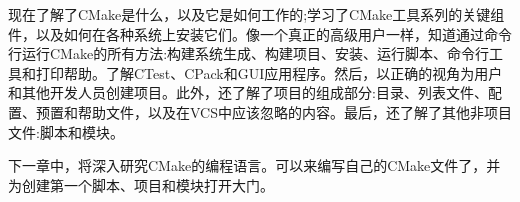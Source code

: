 现在了解了CMake是什么，以及它是如何工作的;学习了CMake工具系列的关键组件，以及如何在各种系统上安装它们。像一个真正的高级用户一样，知道通过命令行运行CMake的所有方法:构建系统生成、构建项目、安装、运行脚本、命令行工具和打印帮助。了解CTest、CPack和GUI应用程序。然后，以正确的视角为用户和其他开发人员创建项目。此外，还了解了项目的组成部分:目录、列表文件、配置、预置和帮助文件，以及在VCS中应该忽略的内容。最后，还了解了其他非项目文件:脚本和模块。

下一章中，将深入研究CMake的编程语言。可以来编写自己的CMake文件了，并为创建第一个脚本、项目和模块打开大门。